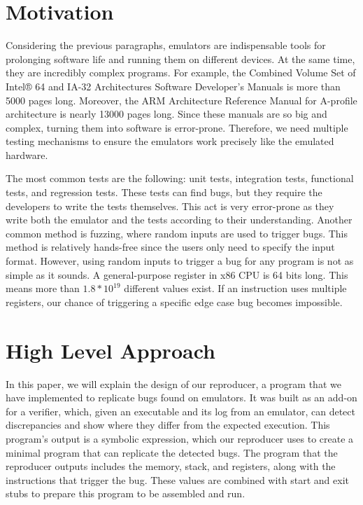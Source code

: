 \section{Motivation}
Considering the previous paragraphs, emulators are indispensable tools for prolonging software life and running them on different devices.
At the same time, they are incredibly complex programs.
For example, the Combined Volume Set of Intel® 64 and IA-32 Architectures Software Developer's Manuals \cite{intel_manual} is more than 5000 pages long.
Moreover, the ARM Architecture Reference Manual for A-profile architecture \cite{ARM_manual} is nearly 13000 pages long.
Since these manuals are so big and complex, turning them into software is error-prone.
Therefore, we need multiple testing mechanisms to ensure the emulators work precisely like the emulated hardware.

The most common tests are the following: unit tests, integration tests, functional tests, and regression tests.
These tests can find bugs, but they require the developers to write the tests themselves.
This act is very error-prone as they write both the emulator and the tests according to their understanding.
Another common method is fuzzing, where random inputs are used to trigger bugs.
This method is relatively hands-free since the users only need to specify the input format.
However, using random inputs to trigger a bug for any program is not as simple as it sounds.
A general-purpose register in x86 CPU is 64 bits long.
This means more than $ 1.8 * 10^{19} $ different values exist.
If an instruction uses multiple registers, our chance of triggering a specific edge case bug becomes impossible.

\section{High Level Approach}
In this paper, we will explain the design of our reproducer, a program that we have implemented to replicate bugs found on emulators.
It was built as an add-on for a verifier, which, given an executable and its log from an emulator, can detect discrepancies and show where they differ from the expected execution.
This program's output is a symbolic expression, which our reproducer uses to create a minimal program that can replicate the detected bugs.
The program that the reproducer outputs includes the memory, stack, and registers, along with the instructions that trigger the bug.
These values are combined with start and exit stubs to prepare this program to be assembled and run.

